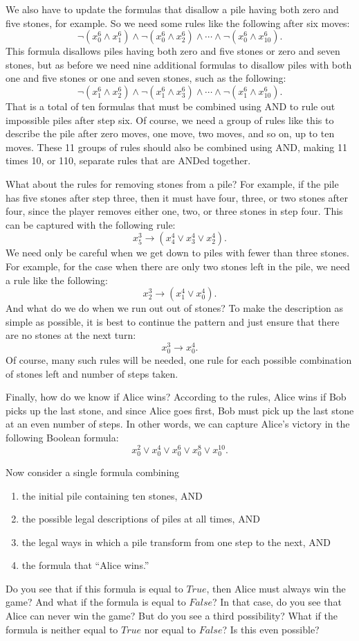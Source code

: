 {{We also have to update the formulas that disallow a pile having both zero and five stones, for example. So we
need some rules like the following after six moves:
$$\neg(x_{0}^{6} \wedge x_{1}^{6}) \wedge \neg(x_{0}^{6} \wedge x_{2}^{6}) \wedge \cdots \wedge \neg(x_{0}^{6} \wedge x_{10}^{6}).$$
This formula disallows piles having both zero and five stones or zero and seven stones, but as before we need nine additional
formulas to disallow piles with both one and five stones or one and seven stones, such as the following:
$$\neg(x_{1}^{6} \wedge x_{2}^{6}) \wedge \neg(x_{1}^{6} \wedge x_{3}^{6}) \wedge \cdots \wedge \neg(x_{1}^{6} \wedge x_{10}^{6}).$$
That is a total of ten formulas that must be combined using AND to rule out impossible piles after step six. Of course,
we need a group of rules like this to describe the pile after zero moves, one move, two moves, and so on, up to ten moves. These
11 groups of rules should also be combined using AND, making 11 times 10, or 110, separate rules that are ANDed together.

What about the rules for removing stones from a pile? For example, if the pile has five stones after step three, then it must
have four, three, or two stones after four, since the player removes either one, two, or three stones in step four. This can
be captured with the following rule:
$$x_{5}^{3} \rightarrow (x_{4}^{4} \vee x_{3}^{4} \vee x_{2}^{4}).$$
We need only be careful when we get down to piles with fewer than three stones. For example, for the case when there are only 
two stones left in the pile, we need a rule like the following:
$$x_{2}^{3} \rightarrow (x_{1}^{4} \vee x_{0}^{4}).$$
And what do we do when we run out out of stones? To make the description as simple as possible, it is best to continue the pattern
and just ensure that there are no stones at the next turn:
$$x_{0}^{3} \rightarrow x_{0}^{4}.$$
Of course, many such rules will be needed, one rule for each possible combination of stones left and number of steps taken.

Finally, how do we know if Alice wins? According to the rules, Alice wins if Bob picks up the last stone, and since Alice
goes first, Bob must pick up the last stone at an even number of steps. In other words, we can capture Alice's victory
in the following Boolean formula:
$$x_{0}^{2} \vee x_{0}^{4} \vee x_{0}^{6} \vee x_{0}^{8} \vee x_{0}^{10}.$$

Now consider a single formula combining
\begin{enumerate}
\item the initial pile containing ten stones, AND
\item the possible legal descriptions of piles at all times, AND
\item the legal ways in which a pile transform from one step to the next, AND
\item the formula that ``Alice wins.''
\end{enumerate}
Do you see that if this formula is equal to $True$, then Alice must always win the game? And what if the formula is 
equal to $False$? In that case, do you see that Alice can never win the game? But do you see a third possibility? 
What if the formula is neither equal to $True$ nor equal to $False$? Is this even possible?

}}
